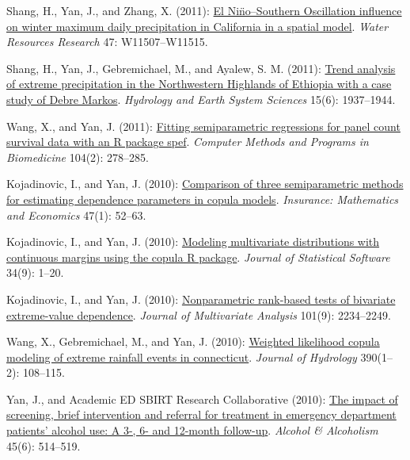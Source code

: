 \begin{RefereedJournalArticles}
\item *Shang, H., Yan, J., and Zhang, X. (2011):
\href{https://doi.org/10.1029/2011WR010415}{El Ni\"{n}o--Southern
Oscillation influence on winter maximum daily precipitation in
California in a spatial model}. \emph{Water Resources Research} 47:
W11507--W11515.

\item *Shang, H., Yan, J., Gebremichael, M., and Ayalew, S. M.
(2011): \href{https://doi.org/10.5194/hess-15-1937-2011}{Trend analysis
of extreme precipitation in the Northwestern Highlands of Ethiopia with
a case study of Debre Markos}. \emph{Hydrology and Earth System
Sciences} 15(6): 1937--1944.

\item *Wang, X., and Yan, J. (2011):
\href{https://doi.org/10.1016/j.cmpb.2010.10.005}{Fitting semiparametric
regressions for panel count survival data with an R package spef}.
\emph{Computer Methods and Programs in Biomedicine} 104(2): 278--285.

\item Kojadinovic, I., and Yan, J. (2010):
\href{https://doi.org/10.1016/j.insmatheco.2010.03.008}{Comparison of
three semiparametric methods for estimating dependence parameters in
copula models}. \emph{Insurance: Mathematics and Economics} 47(1):
52--63.

\item Kojadinovic, I., and Yan, J. (2010):
\href{https://doi.org/10.18637/jss.v034.i09}{Modeling multivariate
distributions with continuous margins using the copula R package}.
\emph{Journal of Statistical Software} 34(9): 1--20.

\item Kojadinovic, I., and Yan, J. (2010):
\href{https://doi.org/10.1016/j.jmva.2010.05.004}{Nonparametric
rank-based tests of bivariate extreme-value dependence}. \emph{Journal
of Multivariate Analysis} 101(9): 2234--2249.

\item *Wang, X., Gebremichael, M., and Yan, J. (2010):
\href{https://doi.org/10.1016/j.jhydrol.2010.06.039}{Weighted likelihood
copula modeling of extreme rainfall events in connecticut}.
\emph{Journal of Hydrology} 390(1--2): 108--115.

\item Yan, J., and Academic ED SBIRT Research Collaborative (2010):
\href{https://doi.org/10.1093/alcalc/agq058}{The impact of screening,
brief intervention and referral for treatment in emergency department
patients' alcohol use: A 3-, 6- and 12-month follow-up}. \emph{Alcohol
\& Alcoholism} 45(6): 514--519.


\end{RefereedJournalArticles}
